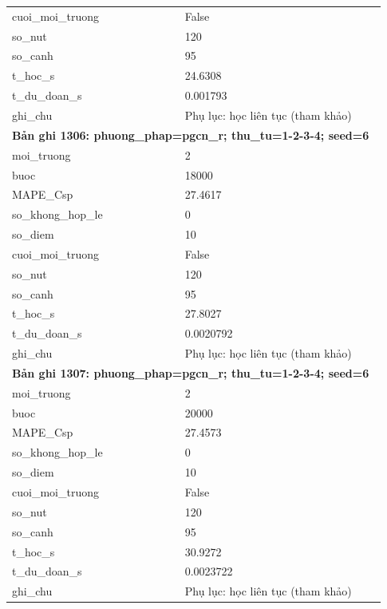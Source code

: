 \begin{longtable}{p{0.43\linewidth}p{0.50\linewidth}}
cuoi\_\allowbreak moi\_\allowbreak truong & False \\
so\_\allowbreak nut & 120 \\
so\_\allowbreak canh & 95 \\
t\_\allowbreak hoc\_\allowbreak s & 24.6308 \\
t\_\allowbreak du\_\allowbreak doan\_\allowbreak s & 0.001793 \\
ghi\_\allowbreak chu & Phụ lục: học liên tục (tham khảo) \\
\midrule
\multicolumn{2}{p{0.95\linewidth}}{\textbf{Bản ghi 1306: phuong\_phap=pgcn\_r; thu\_tu=1-2-3-4; seed=6}} \\
moi\_\allowbreak truong & 2 \\
buoc & 18000 \\
MAPE\_\allowbreak Csp & 27.4617 \\
so\_\allowbreak khong\_\allowbreak hop\_\allowbreak le & 0 \\
so\_\allowbreak diem & 10 \\
cuoi\_\allowbreak moi\_\allowbreak truong & False \\
so\_\allowbreak nut & 120 \\
so\_\allowbreak canh & 95 \\
t\_\allowbreak hoc\_\allowbreak s & 27.8027 \\
t\_\allowbreak du\_\allowbreak doan\_\allowbreak s & 0.0020792 \\
ghi\_\allowbreak chu & Phụ lục: học liên tục (tham khảo) \\
\midrule
\multicolumn{2}{p{0.95\linewidth}}{\textbf{Bản ghi 1307: phuong\_phap=pgcn\_r; thu\_tu=1-2-3-4; seed=6}} \\
moi\_\allowbreak truong & 2 \\
buoc & 20000 \\
MAPE\_\allowbreak Csp & 27.4573 \\
so\_\allowbreak khong\_\allowbreak hop\_\allowbreak le & 0 \\
so\_\allowbreak diem & 10 \\
cuoi\_\allowbreak moi\_\allowbreak truong & False \\
so\_\allowbreak nut & 120 \\
so\_\allowbreak canh & 95 \\
t\_\allowbreak hoc\_\allowbreak s & 30.9272 \\
t\_\allowbreak du\_\allowbreak doan\_\allowbreak s & 0.0023722 \\
ghi\_\allowbreak chu & Phụ lục: học liên tục (tham khảo) \\

\end{longtable}
